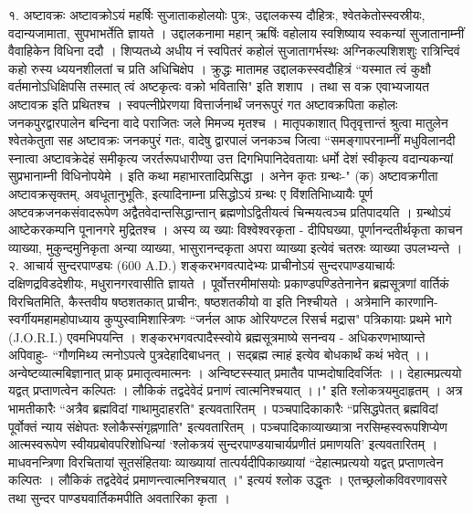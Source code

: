 १. अष्टावक्रः
अष्टावक्रोऽयं महर्षिः सुजाताकहोलयोः पुत्रः, उद्दालकस्य दौहित्रः, श्वेतकेतोस्स्वस्रीयः, वदान्यजामाता, सुपभाभर्तेति ज्ञायते । उद्दालकनामा महान् ऋषिंः वहोलाय स्वशिष्याय स्वकन्यां सुजातानाम्नीं वैवाहिकेन विधिना ददौ । शिप्यतध्ये अधीय नं स्वपितरं कहोलं सुजातागर्भस्थः अग्निकल्पशिशशुः रात्रिन्दिवं कहो रुस्य ध्ययनशीलतां च प्रति अधिचिक्षेप । क्रुद्धः मातामह उद्दालकस्स्वदौहित्रं ``यस्मात त्वं कुक्षौ वर्तमानोऽधिक्षिपसि तस्मात् त्वं अष्टकृत्वः वक्रो भवितासि" इति शशाप । तथा स वक्र एवाभ्यजायत अष्टावक्र इति प्रथितश्च । स्वपत्नीप्रेरणया वित्तार्जनार्थं जनरूपुरं गत अष्टावक्रपिता कहोलः जनकपुरद्वारपालेन बन्दिना वादे पराजितः जले मिमज्य मृतश्च । मातृपकाशात् पितृवृत्तान्तं श्रुत्वा मातुलेन श्वेतकेतुता सह अष्टावक्रः जनकपुरं गतः, वादेषु द्वारपालं जनकञ्च जित्वा ``समङ्गापरनाम्नीं मधुविलानदी स्नात्वा अष्टावक्रेदेहं समीकृत्य जरर्तरूपधारीण्या उत्त दिगभिपानिदेवतायाः धर्मो देशं स्वीकृत्य वदान्यकन्यां सुप्रभानाम्नी विधिनोपयेमे । इति कथा महाभारतादिप्रसिद्धा । अनेन कृतः ग्रन्थः-"
(क) अष्टावक्रगीता
अष्टावक्रसृक्तम्, अवधूतानुभूतिः, इत्यादिनाम्ना प्रसिद्धोऽयं ग्रन्थः ए विंशतिभिाध्यायैः पूर्ण अष्टवक्रजनकसंवादरूपेण अद्वैतवेदान्तसिद्धान्तान् ब्रह्मणोऽद्वितीयत्वं चिन्मयत्वञ्च प्रतिपादयति । ग्रन्थोऽयं आष्टेकरकम्पनि पूनानगरे मुद्रितश्च । अस्य व्य ख्याः विश्वेश्वरकृता - दीपिघख्या, पूर्णानन्दतीर्थकृता काचन व्याख्या, मुकुन्दमुनिकृता अन्या व्याख्या, भासुरानन्दकृता अपरा व्याख्या इत्येवं चतस्रः व्याख्या उपलभ्यन्ते ।
२. आचार्य सुन्दरपाण्ड्यः (600 A.D.)
शङ्करभगवत्पादेभ्यः प्राचीनोऽयं सुन्दरपाण्डयाचार्यः दक्षिणद्रविडदेशीयः, मधुरानगरवासीति ज्ञायते । पूर्वोत्तरमीमांसयोः प्रकाण्डपण्डितेनानेन ब्रह्मसूत्रणां वार्तिकं विरचितमिति, कैस्तवीय षष्ठशतकात् प्राचीनः, षष्ठशतकीयो वा इति निश्चीयते । अत्रेमानि कारणानि-
स्वर्गीयमहामहोपाध्याय कुप्पुस्वामिशास्त्रिणः ``जर्नल आफ ओरियण्टल रिसर्च मद्रास" पत्रिकायाः प्रथमे भागे (J.O.R.I.) एवमभिपयन्ति । शङ्करभगवत्पादैस्स्वोये ब्रह्मसूत्रमाष्ये सनन्वय - अधिकरणभाष्यान्ते अपिवाहुः-
``गौणमिथ्य त्मनोऽपत्वे पुत्रदेहादिबाधनत् ।
सद्ब्रह्म त्माहं इत्येव बोधकार्थं कथं भवेत् ।।
अन्वेष्टव्यात्मबिज्ञानात् प्राक् प्रमातृत्वमात्मनः ।
अन्विष्टस्स्यात् प्रमातैव पाप्मदोषादिवर्जितः ।।
देहात्मप्रत्ययो यद्वत् प्रप्ताणत्वेन कल्पितः ।
लौकिकं तद्वदेवेदं प्रनाणं त्वात्मनिश्चयात् ।।" इति 
श्लोकत्रयमुदाहृतम् । अत्र भामतीकारैः ``अत्रैव ब्रह्मविदां गाथामुदाहरति" इत्यवतारितम् । पञ्चपादिकाकारैः ``प्रसिद्धपेतत् ब्रह्मविदां पूर्वोक्तं न्याय संक्षेपतः श्लोकैस्संगृह्नणाति" इत्यवतारितम् । पञ्चपादिकाव्याख्यात्रा नरसिम्हस्वरूपशिप्येण आत्मस्वरूपेण स्वीयप्रबोवपरिशोधिन्यां `श्लोकत्रयं सुन्दरपाण्डयाचार्यप्रणीतं प्रमाणयति' इत्यवतारितम् ।
माधवनन्त्रिणा विरचितायां सूतसंहितयाः व्याख्यायां तात्पर्यदीपिकाख्यायां ``देहात्मप्रत्ययो यद्वत् प्रप्ताणत्वेन कल्पितः । लौकिकं तद्वदेवेदं प्रमाणन्त्वात्मनिश्चयात् ।" इत्ययं श्लोक उद्धृतः । एतच्छ्रलोकविवरणावसरे तथा सुन्दर पाण्ड्यवार्तिकमपीति अवतारिका कृता । 
